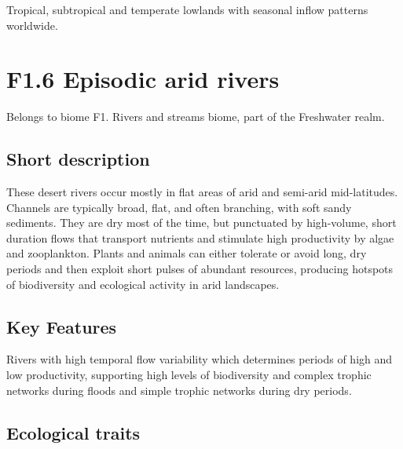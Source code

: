\documentclass[
  letterpaper,
  DIV=11,
  numbers=noendperiod]{scrartcl}
\begin{document}
Tropical, subtropical and temperate lowlands with seasonal inflow
patterns worldwide.

\section{F1.6 Episodic arid rivers}\label{f1.6-episodic-arid-rivers}

Belongs to biome F1. Rivers and streams biome, part of the Freshwater
realm.

\subsection{Short description}\label{short-description-5}

These desert rivers occur mostly in flat areas of arid and semi-arid
mid-latitudes. Channels are typically broad, flat, and often branching,
with soft sandy sediments. They are dry most of the time, but punctuated
by high-volume, short duration flows that transport nutrients and
stimulate high productivity by algae and zooplankton. Plants and animals
can either tolerate or avoid long, dry periods and then exploit short
pulses of abundant resources, producing hotspots of biodiversity and
ecological activity in arid landscapes.

\subsection{Key Features}\label{key-features-5}

Rivers with high temporal flow variability which determines periods of
high and low productivity, supporting high levels of biodiversity and
complex trophic networks during floods and simple trophic networks
during dry periods.

\subsection{Ecological traits}\label{ecological-traits-5}
\end{document}
